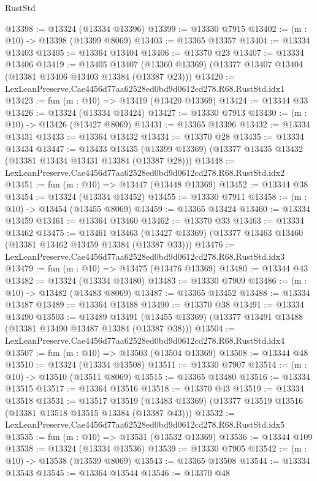 \begin{lexlean}{RustStd}
\begin{coremodule}
@13398 := @13324 (@13334 @13396)
@13399 := @13330 @7915
@13402 := (m : @10) -> @13398 (@13399 @8069)
@13403 := @13365 @13357
@13404 := @13334 @13403
@13405 := @13364 @13404
@13406 := @13370 @23
@13407 := @13334 @13406
@13419 := @13405
    @13407
    (@13360 @13369)
    (@13377 @13407 @13404 (@13381 @13406 @13403 @13384 (@13387 @23)))
@13420 := LexLeanPreserve.Cae4456d77aa62528ed0bd9d0612cd278.R68.RustStd.idx1
@13423 := fun (m : @10) => @13419 (@13420 @13369)
@13424 := @13344 @33
@13426 := @13324 (@13334 @13424)
@13427 := @13330 @7913
@13430 := (m : @10) -> @13426 (@13427 @8069)
@13431 := @13365 @13396
@13432 := @13334 @13431
@13433 := @13364 @13432
@13434 := @13370 @28
@13435 := @13334 @13434
@13447 := @13433
    @13435
    (@13399 @13369)
    (@13377 @13435 @13432 (@13381 @13434 @13431 @13384 (@13387 @28)))
@13448 := LexLeanPreserve.Cae4456d77aa62528ed0bd9d0612cd278.R68.RustStd.idx2
@13451 := fun (m : @10) => @13447 (@13448 @13369)
@13452 := @13344 @38
@13454 := @13324 (@13334 @13452)
@13455 := @13330 @7911
@13458 := (m : @10) -> @13454 (@13455 @8069)
@13459 := @13365 @13424
@13460 := @13334 @13459
@13461 := @13364 @13460
@13462 := @13370 @33
@13463 := @13334 @13462
@13475 := @13461
    @13463
    (@13427 @13369)
    (@13377 @13463 @13460 (@13381 @13462 @13459 @13384 (@13387 @33)))
@13476 := LexLeanPreserve.Cae4456d77aa62528ed0bd9d0612cd278.R68.RustStd.idx3
@13479 := fun (m : @10) => @13475 (@13476 @13369)
@13480 := @13344 @43
@13482 := @13324 (@13334 @13480)
@13483 := @13330 @7909
@13486 := (m : @10) -> @13482 (@13483 @8069)
@13487 := @13365 @13452
@13488 := @13334 @13487
@13489 := @13364 @13488
@13490 := @13370 @38
@13491 := @13334 @13490
@13503 := @13489
    @13491
    (@13455 @13369)
    (@13377 @13491 @13488 (@13381 @13490 @13487 @13384 (@13387 @38)))
@13504 := LexLeanPreserve.Cae4456d77aa62528ed0bd9d0612cd278.R68.RustStd.idx4
@13507 := fun (m : @10) => @13503 (@13504 @13369)
@13508 := @13344 @48
@13510 := @13324 (@13334 @13508)
@13511 := @13330 @7907
@13514 := (m : @10) -> @13510 (@13511 @8069)
@13515 := @13365 @13480
@13516 := @13334 @13515
@13517 := @13364 @13516
@13518 := @13370 @43
@13519 := @13334 @13518
@13531 := @13517
    @13519
    (@13483 @13369)
    (@13377 @13519 @13516 (@13381 @13518 @13515 @13384 (@13387 @43)))
@13532 := LexLeanPreserve.Cae4456d77aa62528ed0bd9d0612cd278.R68.RustStd.idx5
@13535 := fun (m : @10) => @13531 (@13532 @13369)
@13536 := @13344 @109
@13538 := @13324 (@13334 @13536)
@13539 := @13330 @7905
@13542 := (m : @10) -> @13538 (@13539 @8069)
@13543 := @13365 @13508
@13544 := @13334 @13543
@13545 := @13364 @13544
@13546 := @13370 @48

\end{coremodule}
\end{lexlean}
